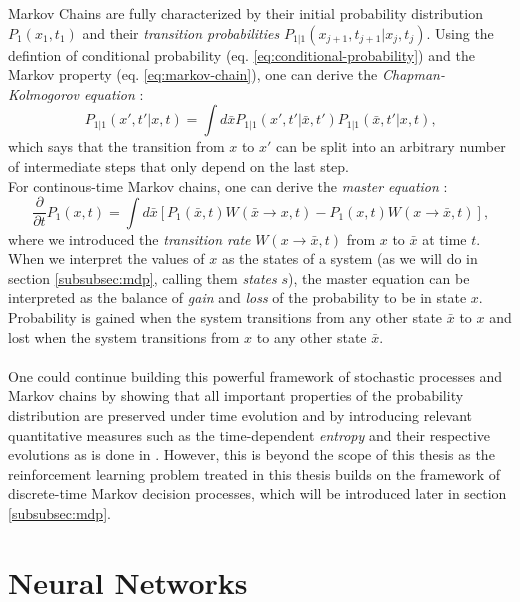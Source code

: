 Markov Chains are fully characterized by their initial probability distribution $P_1(x_1, t_1)$ and their \textit{transition probabilities} $P_{1|1}(x_{j+1}, t_{j+1} | x_j, t_j)$. Using the defintion of conditional probability (eq. \ref{eq:conditional-probability}) and the Markov property (eq. \ref{eq:markov-chain}), one can derive the \textit{Chapman-Kolmogorov equation} \cite[page 59]{tauber_critical_2014}:
\begin{equation}
    P_{1|1}(x', t' | x, t) = \int d\bar{x} P_{1|1}(x', t' | \bar{x}, t') P_{1|1}(\bar{x}, t' | x, t) \text{,}
    \label{eq:chapman-kolmogorov}
\end{equation}
which says that the transition from $x$ to $x'$ can be split into an arbitrary number of intermediate steps that only depend on the last step.
\\
For continous-time Markov chains, one can derive the \textit{master equation} \cite[page 60]{tauber_critical_2014}:
\begin{equation}
    \frac{\partial}{\partial t} P_1(x, t) = \int d\bar{x} \left[ P_1(\bar{x}, t) W(\bar{x} \rightarrow x, t) - P_1(x, t) W(x \rightarrow \bar{x}, t) \right] \text{,}
    \label{eq:master-equation}
\end{equation}
where we introduced the \textit{transition rate} $W(x \rightarrow \bar{x}, t)$ from $x$ to $\bar{x}$ at time $t$. When we interpret the values of $x$ as the states of a system (as we will do in section \ref{subsubsec:mdp}, calling them \textit{states} $s$), the master equation can be interpreted as the balance of \textit{gain} and \textit{loss} of the probability to be in state $x$. Probability is gained when the system transitions from any other state $\bar{x}$ to $x$ and lost when the system transitions from $x$ to any other state $\bar{x}$.
\\
\\
One could continue building this powerful framework of stochastic processes and Markov chains by showing that all important properties of the probability distribution are preserved under time evolution and by introducing relevant quantitative measures such as the time-dependent \textit{entropy} and their respective evolutions as is done in \cite[chapter 2.2]{tauber_critical_2014}. However, this is beyond the scope of this thesis as the reinforcement learning problem treated in this thesis builds on the framework of discrete-time Markov decision processes, which will be introduced later in section \ref{subsubsec:mdp}.

\chapter{Neural Networks}
\label{ch:neural-networks}
